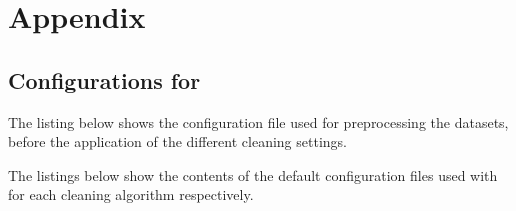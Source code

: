 \chapter{Appendix}
\label{ap:appendix}

\section{Configurations for \ctapipe{}}
\label{ap:config_files}

The listing below shows the configuration file used for preprocessing the datasets, \ie{} before the
application of the different cleaning settings.
\begin{spacing}{0.5}
    \begin{mdframed}[backgroundcolor=codebg, hidealllines=true, leftmargin=0cm,rightmargin=0cm, skipabove=0pt, innerleftmargin=0,innerrightmargin=0,]
    
    \end{mdframed}
\end{spacing}

The listings below show the contents of the default configuration files used with \ctapipe{}
for each cleaning algorithm respectively.

